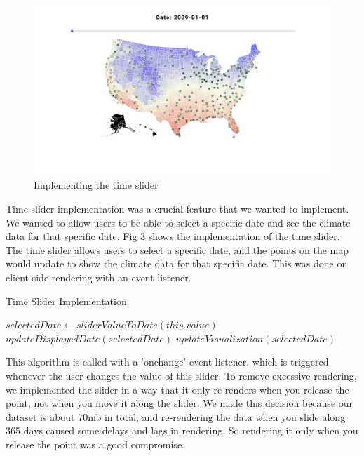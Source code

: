 \documentclass[9pt,twocolumn,twoside]{opticajnl}
\begin{document}
\begin{figure}
    \centering
    \includegraphics[scale=0.10]{images/img3.png}
    \caption{Implementing the time slider}
\end{figure}

Time slider implementation was a crucial feature that we wanted to implement. We wanted to allow users to be able to select a specific date and see the climate data for that specific date. Fig 3 shows the implementation of the time slider. The time slider allows users to select a specific date, and the points on the map would update to show the climate data for that specific date. This was done on client-side rendering with an event listener.

\begin{algorithm}
    \caption{Time Slider Implementation}
    \begin{algorithmic}[1]
    \State $selectedDate \gets sliderValueToDate(this.value)$
    \State $updateDisplayedDate(selectedDate)$
    \State $updateVisualization(selectedDate)$
    \EndProcedure
    \end{algorithmic}
\end{algorithm}

This algorithm is called with a 'onchange' event listener, which is triggered whenever the user changes the value of this slider. To remove excessive rendering, we implemented the slider in a way that it only re-renders when you release the point, not when you move it along the slider. We made this decision because our dataset is about 70mb in total, and re-rendering the data when you slide along 365 days caused some delays and lags in rendering. So rendering it only when you release the point was a good compromise.
\end{document}
